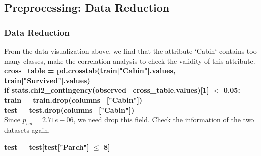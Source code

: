 \documentclass{beamer}
\begin{document}
\subsection{Preprocessing: Data Reduction}
\begin{frame}
	\frametitle{Data Reduction}
	\begin{flushleft}
		From the data visualization above, we find that the attribute `Cabin` contains too many classes, make the correlation analysis to check the validity of this attribute. \\
		\textbf{\color{blue}
			cross\_table = pd.crosstab(train["Cabin"].values, train["Survived"].values) \\
			if stats.chi2\_contingency(observed=cross\_table.values)[1] $<$ 0.05:\\
	    \quad train = train.drop(columns=["Cabin"]) \\
	    \quad test = test.drop(columns=["Cabin"])
		} \\
		Since $p_{val} = 2.71e-06$, we need drop this field. Check the information of the two datasets again.
	\end{flushleft}
	\begin{center}
		\textbf{\color{blue}test = test[test["Parch"] $\le$ 8]}
	\end{center}
\end{frame}
\end{document}
